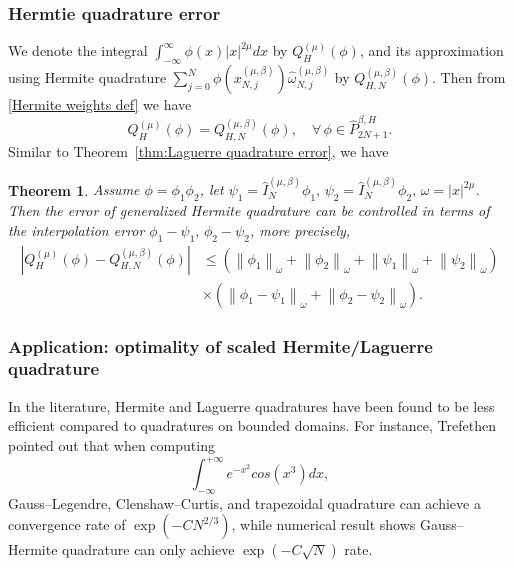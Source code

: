 \documentclass[pdflatex,sn-aps]{sn-jnl}%
\theoremstyle{thmstyleone}%
\newtheorem{theorem}{Theorem}[section]%
\theoremstyle{thmstyletwo}%
\theoremstyle{thmstylethree}%
\begin{document}
\subsubsection{Hermtie quadrature error}
We denote the integral $\int_{-\infty}^{\infty} \phi(x)|x|^{2 \mu} d x$
by $Q_H^{(\mu)}(\phi)$, and its approximation using Hermite quadrature
$\sum_{j=0}^N \phi\left(x_{N, j}^{(\mu, \beta)}\right) \widehat{\omega}_{N, j}^{(\mu, \beta)}$
by $Q_{H, N}^{(\mu, \beta)}(\phi)$. Then from \eqref{Hermite weights def}
we have
\begin{equation}\label{eq:0926-7}
  Q_H^{(\mu)}(\phi)=Q_{H, N}^{(\mu, \beta)}(\phi), \quad \forall\, \phi \in \widehat{P}_{2 N+1}^{\beta, H}.
\end{equation}
Similar to Theorem~\ref{thm:Laguerre quadrature error}, we have
\begin{theorem}\label{thm:Hermite quadrature error}
  Assume $\phi=\phi_1 \phi_2$, let $\psi_1=\widehat{I}_{N}^{(\mu, \beta)} \phi_1, \,\psi_2=\widehat{I}_{N}^{(\mu, \beta)} \phi_2, \,\omega=|x|^{2\mu}$.
  Then the error of generalized Hermite quadrature can be controlled in terms of the interpolation error
  $\phi_1-\psi_1,\,\phi_2-\psi_2$, more precisely,
  \begin{equation}\label{eq:0926-8}
    \begin{aligned}
    \left|Q_H^{(\mu)}(\phi)-Q_{H, N}^{(\mu, \beta)}(\phi)\right| & \leqslant\left(\left\|\phi_1\right\|_\omega+\left\|\phi_2\right\|_\omega+\left\|\psi_1\right\|_\omega+\left\|\psi_2\right\|_\omega\right) \\
    & \times\left(\left\|\phi_1-\psi_1\right\|_\omega+\left\|\phi_2-\psi_2\right\|_\omega\right).
    \end{aligned}
  \end{equation}
\end{theorem}

\subsubsection{Application: optimality of scaled Hermite/Laguerre quadrature}
\label{subsec:optimality}
In the literature, Hermite and Laguerre quadratures have been found to be less efficient compared to quadratures on bounded domains.
For instance, Trefethen~\cite{trefethen2022exactness} pointed out that when computing
\begin{equation}\label{eq:0113-6}
  \int_{-\infty}^{+\infty} e^{-x^2} cos(x^3) dx,
\end{equation}
Gauss--Legendre, Clenshaw--Curtis, and trapezoidal
quadrature can achieve a convergence rate of $\exp(-CN^{2/3})$, while numerical result shows
Gauss--Hermite quadrature can only achieve $\exp(-C\sqrt{N})$ rate.
\end{document}
